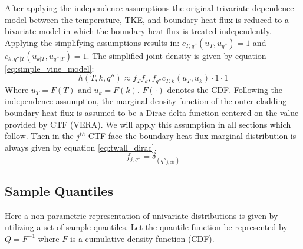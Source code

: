 After applying the independence assumptions the original trivariate dependence model between the temperature, TKE, and boundary heat flux is reduced to a bivariate model in which the boundary heat flux is treated independently.  Applying the simplifying assumptions results in: $c_{T,q''}(u_T, u_{q''}) = 1$ and $c_{k,q''|T}(u_{k|T}, u_{q''|T}) = 1$. The simplified joint density is given by equation \ref{eq:simple_vine_model}:
\begin{equation}
h(T, k, q'') \approx  f_T f_k, f_{q''} c_{T,k}(u_{T}, u_{k})  \cdot 1 \cdot 1
\label{eq:simple_vine_model}
\end{equation}
Where $u_T=F(T)$ and $u_k = F(k)$. $F(\cdot)$ denotes the CDF.
Following the independence assumption, the marginal density function of the outer cladding boundary heat flux is assumed to be a Dirac delta function centered on the value provided by CTF (VERA).  We will apply this assumption in all sections which follow.
Then in the $j^{th}$ CTF face the boundary heat flux marginal distribution is always given by equation \ref{eq:twall_dirac}.
\begin{equation}
f_{j,q''} = \delta_{(q''_{j, \mathrm{ctf}})}
\label{eq:twall_dirac}
\end{equation}





\subsection{Sample Quantiles}
\label{chap:quantiles}

Here a non parametric representation of univariate distributions is given by utilizing a set of sample quantiles.
Let the quantile function be represented by $Q=F^{-1}$ where $F$ is a cumulative density function (CDF).


